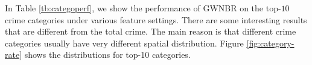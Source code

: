 In Table \ref{tb:categoperf}, we show the performance of GWNBR on the top-$10$ crime categories under various feature settings.  There are some interesting results that are different from the total crime. The main reason is that different crime categories usually have very different spatial distribution. Figure \ref{fig:category-rate} shows the distributions for top-10 categories.
\begin{figure}
	\centering


\end{figure}
